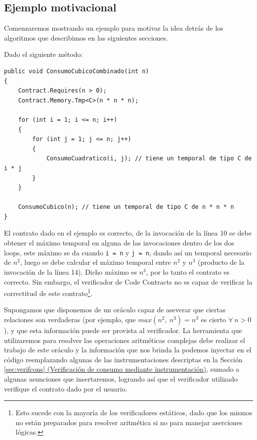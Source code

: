 \documentclass[12pt,a4paper]{article}
\newcommand\mono[1]{\texttt{#1}}
\begin{document}
		\subsection{Ejemplo motivacional}
			Comenzaremos mostrando un ejemplo para motivar la idea detrás de los algoritmos que describimos en las siguientes secciones.

			Dado el siguiente método:

			\vspace{15pt}
			\begin{footnotesize}
			\begin{lstlisting}[caption=Ejemplo motivacional para verificación de contratos con aritmética no lineal, label=ejverifbarv]
public void ConsumoCubicoCombinado(int n)
{
	Contract.Requires(n > 0);
	Contract.Memory.Tmp<C>(n * n * n);

	for (int i = 1; i <= n; i++)
	{
		for (int j = 1; j <= n; j++)
		{
			ConsumoCuadratico(i, j); // tiene un temporal de tipo C de i * j
		}
	}

	ConsumoCubico(n); // tiene un temporal de tipo C de n * n * n
}
			\end{lstlisting}
			\end{footnotesize}

			El contrato dado en el ejemplo es correcto, de la invocación de la línea 10 se debe obtener el máximo temporal en alguna de las invocaciones dentro de los dos loops, este máximo se da cuando \mono{i = n} y \mono{j = n}, dando así un temporal necesario de $n^2$, luego se debe calcular el máximo temporal entre $n^2$ y $n^3$ (producto de la invocación de la línea 14). Dicho máximo es $n^3$, por lo tanto el contrato es correcto. Sin embargo, el verificador de Code Contracts no es capaz de verificar la correctitud de este contrato\footnote{Esto sucede con la mayoría de los verificadores estáticos, dado que los mismos no están preparados para resolver aritmética si no para manejar aserciones lógicas.}.

			Supongamos que disponemos de un oráculo capaz de aseverar que ciertas relaciones son verdaderas (por ejemplo, que $max(n^2,\ n^3) = n^3$ es cierto $\forall\ n > 0$), y que esta información puede ser provista al verificador. La herramienta que utilizaremos para resolver las operaciones aritméticas complejas debe realizar el trabajo de este oráculo y la información que nos brinda la podemos inyectar en el código reemplazando algunas de las instrumentaciones descriptas en la Sección \hyperref[sec:verifcons]{\ref*{sec:verifcons} (Verificación de consumo mediante instrumentación)}, sumado a algunas asunciones que insertaremos, logrando así que el verificador utilizado verifique el contrato dado por el usuario.
\end{document}
